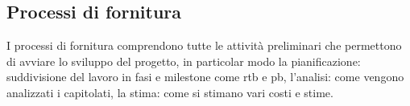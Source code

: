 \documentclass[a4paper,12pt]{article}
\begin{document}
\subsection{Processi di fornitura}
I processi di fornitura comprendono tutte le attività preliminari che permettono di avviare lo sviluppo del progetto, in particolar modo la pianificazione: suddivisione del lavoro in fasi e milestone come rtb e pb, l’analisi: come vengono analizzati i capitolati, la stima: come si stimano vari costi e stime.
\end{document}
